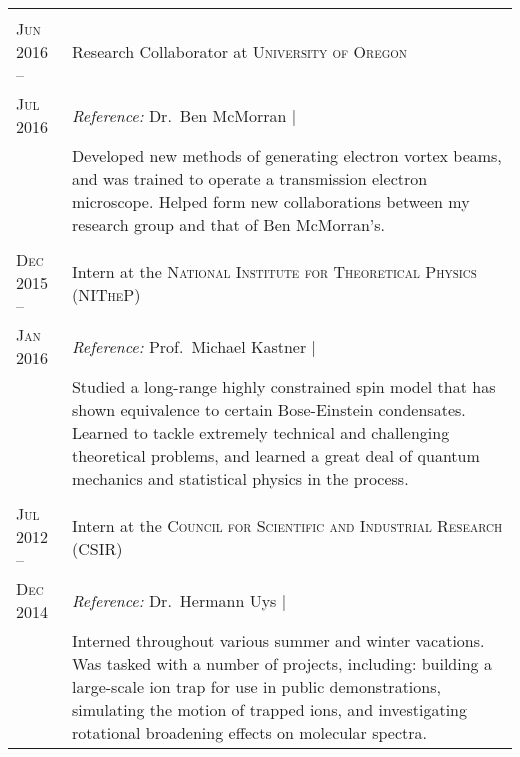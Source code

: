 \begin{supertabular}{p{1.8cm}|p{12cm}}
	 \\
	\textsc{Jun 2016 --}    	& Research Collaborator at \textsc{University of Oregon} \\
	\textsc{Jul 2016}			& \emph{Reference:} Dr.\ Ben McMorran | \\
	 							& \footnotesize{Developed new methods of generating electron vortex beams, and was trained to operate a transmission electron microscope. Helped form new collaborations between my research group and that of Ben McMorran’s.}\\
	 \\
	\textsc{Dec 2015 --} 		& Intern at the \textsc{National Institute for Theoretical Physics (NITheP)} \\
	\textsc{Jan 2016} 			& \emph{Reference:} Prof.\ Michael Kastner | \\
	 							& \footnotesize{Studied a long-range highly constrained spin model that has shown equivalence to certain Bose-Einstein condensates. Learned to tackle extremely technical and challenging theoretical problems, and learned a great deal of quantum mechanics and statistical physics in the process.}\\
	 \\
	\textsc{Jul 2012 --} 		& Intern at the \textsc{Council for Scientific and Industrial Research (CSIR)} \\
	\textsc{Dec 2014}			& \emph{Reference:} Dr.\ Hermann Uys | \\
	 							& \footnotesize{Interned throughout various summer and winter vacations. Was tasked with a number of projects, including: building a large-scale ion trap for use in public demonstrations, simulating the motion of trapped ions, and investigating rotational broadening effects on molecular spectra.} \\
\end{supertabular}